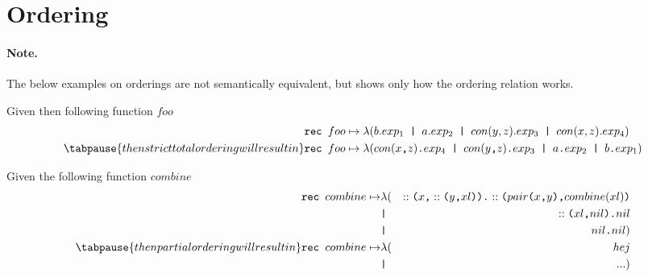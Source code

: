 
\newcommand{\patexp}[2]{#1 \texttt{.} #2}
\newcommand{\fargs}[2]{#1 \texttt{ | } #2}
\newcommand{\cargs}[2]{#1 \texttt{,} #2}
\newcommand{\con}[2]{#1 \texttt{(} #2 \texttt{)}}
\newcommand{\fcall}[2]{#1 \texttt{(} #2 \texttt{)}}







\section{Ordering}

\paragraph{Note.} The below examples on orderings are not semantically
equivalent, but shows only how the ordering relation works.


\begin{example}
  Given then following function $foo$
  \begin{eqnarray*}[rl]
    \texttt{rec } foo & \mapsto \lambda (b.exp_1 \texttt{ | } a.exp_2 \texttt{ | }
    con(y, z).exp_3 \texttt{ | } con(x, z).exp_4) \\
\tabpause{then strict total ordering will result in}
    \texttt{rec } foo & \mapsto \lambda (con(x\texttt{,} z)\texttt{.}exp_4 \texttt{ |
    } con(y\texttt{,} z)\texttt{.}exp_3 \texttt{ | } a\texttt{.}exp_2 \texttt{ | }
    b\texttt{.}exp_1)
\end{eqnarray*}
\end{example}


\begin{example}
  Given the following function $combine$
  \begin{eqnarray*}[rll]
    \texttt{rec } combine \mapsto 
    & \lambda ( & \patexp{\con{::}{\cargs{x}{\con{::}{\cargs{y}{xl}}}}}{\fcall{::}{\cargs{\con{pair}{\cargs{x}{y}}}{combine(xl)}}} \\
      & \texttt{|} & \patexp{\fcall{::}{\cargs{xl}{nil}}}{nil} \\
      & \texttt{|} & \patexp{nil}{nil} )\\
\tabpause{then partial ordering will result in}
    \texttt{rec } combine \mapsto 
    & \lambda ( & hej \\
    & \texttt{|} & ... )
  \end{eqnarray*}
\end{example}


